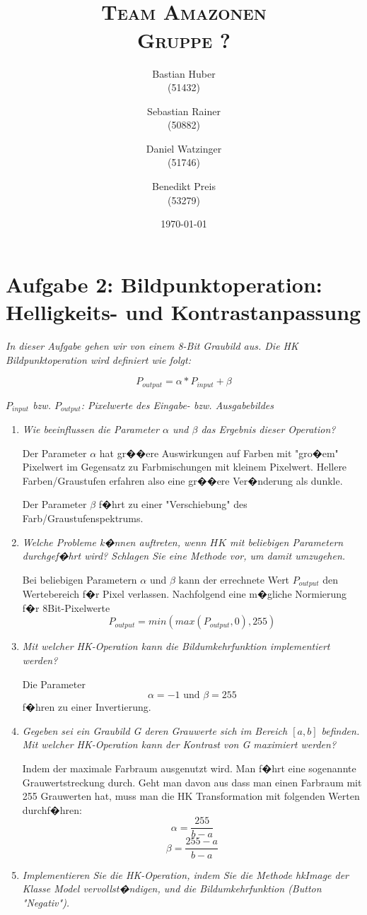 \documentclass{article}
\author{Bastian Huber\\(51432) \and Sebastian Rainer\\(50882) \and Daniel Watzinger\\(51746) \and Benedikt Preis \\(53279)}
\title{\textbf{\huge{\thetitle}}\\\Large\textsc{Team Amazonen}\\\large\textsc{Gruppe ?}}
\date{\today}
\newcommand{\mysection}[1]{\section*{#1} \setcounter{subsection}{0}}
\begin{document}
\hyphenation{}

\maketitle

\pagestyle{fancy}


\mysection{Aufgabe 2: Bildpunktoperation: Helligkeits- und Kontrastanpassung}
\textit{In dieser Aufgabe gehen wir von einem 8-Bit Graubild aus. Die HK Bildpunktoperation wird
definiert wie folgt:}

$$P_{output} = \alpha * P_{input} + \beta$$

\textit{$P_{input}$ bzw. $P_{output}$: Pixelwerte des Eingabe- bzw. Ausgabebildes}

\begin{enumerate}
	\item \textit{Wie beeinflussen die Parameter $\alpha$ und $\beta$ das Ergebnis dieser Operation?}
	
		Der Parameter $\alpha$ hat gr��ere Auswirkungen auf Farben mit "gro�em" Pixelwert im Gegensatz zu Farbmischungen mit kleinem Pixelwert. Hellere Farben/Graustufen
		erfahren also eine gr��ere Ver�nderung als dunkle.
		
		Der Parameter $\beta$ f�hrt zu einer "Verschiebung" des Farb/Graustufenspektrums.
	\item \textit{Welche Probleme k�nnen auftreten, wenn $HK$ mit beliebigen Parametern durchgef�hrt wird? Schlagen Sie eine Methode vor, um damit umzugehen.}
	
	Bei beliebigen Parametern $\alpha$ und $\beta$ kann der errechnete Wert $P_{output}$ den Wertebereich f�r Pixel verlassen. Nachfolgend eine m�gliche Normierung f�r
	8Bit-Pixelwerte
	$$P_{output} = min(max(P_{output}, 0),255)$$
	\item \textit{Mit welcher HK-Operation kann die Bildumkehrfunktion implementiert werden?}
	
	Die Parameter
	$$\alpha = -1 \text{ und } \beta = 255$$
	f�hren zu einer Invertierung.
	\item \textit{Gegeben sei ein Graubild G deren Grauwerte sich im Bereich $[a, b]$ befinden. Mit welcher
HK-Operation kann der Kontrast von G maximiert werden?}

	Indem der maximale Farbraum ausgenutzt wird. Man f�hrt eine sogenannte Grauwertstreckung durch. Geht man davon aus dass man einen Farbraum mit 255 Grauwerten hat, muss man die HK Transformation mit folgenden Werten durchf�hren:
	$$ \alpha = \frac{255}{b-a} $$
	$$ \beta = \frac{255-a}{b-a} $$
	\item \textit{Implementieren Sie die HK-Operation, indem Sie die Methode hkImage der Klasse Model
vervollst�ndigen, und die Bildumkehrfunktion (Button "Negativ").}

	
\end{enumerate}
\end{document}
